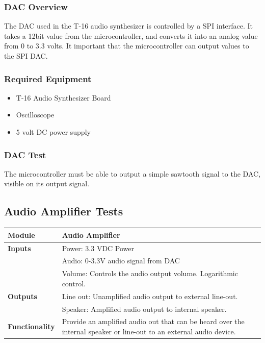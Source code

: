 \documentclass{article}
\begin{document}
\subsubsection{DAC Overview}
The DAC used in the T-16 audio synthesizer is controlled by a SPI
interface. It takes a 12bit value from the microcontroller, and
converts it into an analog value from 0 to 3.3 volts. It important
that the microcontroller can output values to the SPI DAC. 

\subsubsection{Required Equipment}
\begin{itemize}
  \item T-16 Audio Synthesizer Board
  \item Oscilloscope
  \item 5 volt DC power supply
\end{itemize}

\subsubsection{DAC Test}
The microcontroller must be able to output a simple sawtooth signal to
the DAC, visible on its output signal.

\subsection{Audio Amplifier Tests}

\begin{tabular}{|p{1in}|p{5in}|}
\hline
\textbf{Module} & Audio Amplifier \\
\hline
\textbf{Inputs} & Power: 3.3 VDC Power\\
	      & Audio: 0-3.3V audio signal from DAC\\
	      & Volume: Controls the audio output volume. Logarithmic control.\\
\hline
\textbf{Outputs}& Line out: Unamplified audio output to external line-out.\\ 
	      & Speaker: Amplified audio output to internal speaker.\\
\hline
\textbf{Functionality}& Provide an amplified audio out that can be heard over the internal speaker or line-out to an external audio device.\\
\hline
\end{tabular}
\end{document}
